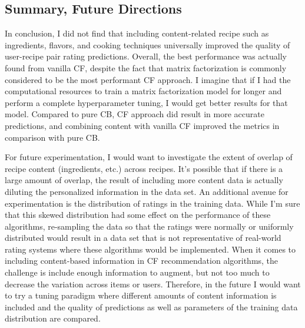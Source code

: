 \documentclass{article}
\begin{document}
\subsection{Summary, Future Directions}

In conclusion, I did not find that including content-related recipe such as ingredients, flavors, and cooking techniques universally improved the quality of user-recipe pair rating predictions. Overall, the best performance was actually found from vanilla CF, despite the fact that matrix factorization is commonly considered to be the most performant CF approach. I imagine that if I had the computational resources to train a matrix factorization model for longer and perform a complete hyperparameter tuning, I would get better results for that model. Compared to pure CB, CF approach did result in more accurate predictions, and combining content with vanilla CF improved the metrics in comparison with pure CB. 

For future experimentation, I would want to investigate the extent of overlap of recipe content (ingredients, etc.) across recipes. It's possible that if there is a large amount of overlap, the result of including more content data is actually diluting the personalized information in the data set. An additional avenue for experimentation is the distribution of ratings in the training data. While I'm sure that this skewed distribution had some effect on the performance of these algorithms, re-sampling the data so that the ratings were normally or uniformly distributed would result in a data set that is not representative of real-world rating systems where these algorithms would be implemented. When it comes to including content-based information in CF recommendation algorithms, the challenge is include enough information to augment, but not too much to decrease the variation across items or users. Therefore, in the future I would want to try a tuning paradigm where different amounts of content information is included and  the quality of predictions as well as parameters of the training data distribution are compared. 

\newpage
\end{document}
